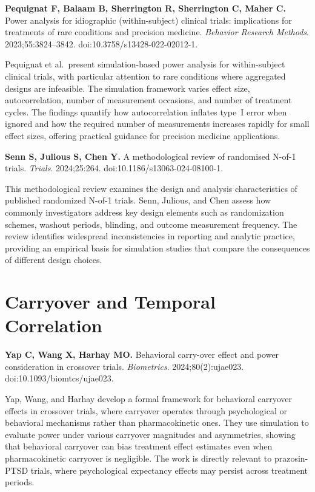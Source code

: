 \documentclass[11pt]{article}
\begin{document}
\medskip
\textbf{Pequignat F, Balaam B, Sherrington R, Sherrington
C, Maher C.} Power analysis for idiographic
(within-subject) clinical trials: implications for
treatments of rare conditions and precision medicine.
\textit{Behavior Research Methods}. 2023;55:3824--3842.
doi:10.3758/s13428-022-02012-1.

\smallskip\noindent
Pequignat et al.\ present simulation-based power analysis
for within-subject clinical trials, with particular
attention to rare conditions where aggregated designs are
infeasible. The simulation framework varies effect size,
autocorrelation, number of measurement occasions, and
number of treatment cycles. The findings quantify how
autocorrelation inflates type~I error when ignored and how
the required number of measurements increases rapidly for
small effect sizes, offering practical guidance for
precision medicine applications.

\medskip
\textbf{Senn S, Julious S, Chen Y.} A methodological
review of randomised N-of-1 trials. \textit{Trials}.
2024;25:264. doi:10.1186/s13063-024-08100-1.

\smallskip\noindent
This methodological review examines the design and
analysis characteristics of published randomized N-of-1
trials. Senn, Julious, and Chen assess how commonly
investigators address key design elements such as
randomization schemes, washout periods, blinding, and
outcome measurement frequency. The review identifies
widespread inconsistencies in reporting and analytic
practice, providing an empirical basis for simulation
studies that compare the consequences of different design
choices.

\section{Carryover and Temporal Correlation}

\textbf{Yap C, Wang X, Harhay MO.} Behavioral carry-over
effect and power consideration in crossover trials.
\textit{Biometrics}. 2024;80(2):ujae023.
doi:10.1093/biomtcs/ujae023.

\smallskip\noindent
Yap, Wang, and Harhay develop a formal framework for
behavioral carryover effects in crossover trials, where
carryover operates through psychological or behavioral
mechanisms rather than pharmacokinetic ones. They use
simulation to evaluate power under various carryover
magnitudes and asymmetries, showing that behavioral
carryover can bias treatment effect estimates even when
pharmacokinetic carryover is negligible. The work is
directly relevant to prazosin-PTSD trials, where
psychological expectancy effects may persist across
treatment periods.
\end{document}
